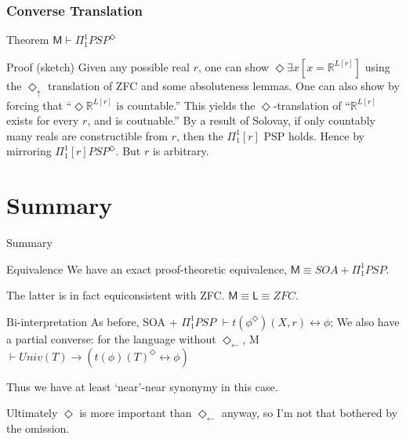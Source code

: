 \documentclass{beamer}
\newcommand{\dl}{\Diamond_\leftarrow}
\begin{document}
\begin{frame}
    \frametitle{Converse Translation}
\begin{block}{Theorem}
$\mathsf{M} \vdash \Pi_1^1 PSP^\Diamond$
\end{block}
\begin{block}{Proof (sketch)}
     Given any possible real $r$, one can show $\Diamond \exists x[ x = \mathbb{R}^{L[r]}]$
    using the $\Diamond_\uparrow$ translation of ZFC and some absoluteness lemmas. 
     One can also show by forcing that ``$\Diamond \mathbb{R}^{L[r]} \text{ is countable}$.''
     This yields the $\Diamond$-translation of ``$\mathbb{R}^{L[r]}$ exists for every $r$, and is coutnable.''
     By a result of Solovay, if only countably many reals are constructible 
    from $r$, then the $\Pi_1^1[r]$ PSP holds.
     Hence by mirroring $\Pi_1^1[r] PSP^\Diamond$.
     But $r$ is arbitrary.
    
\end{block}
\end{frame}
\section{Summary}
\begin{frame}{Summary}
    \begin{block}{Equivalence}
        We have an exact proof-theoretic equivalence, $\mathsf{M} \equiv SOA + \Pi_1^1 PSP$.

         The latter is in fact equiconsistent with ZFC. $\mathsf{M} \equiv \mathsf{L} \equiv ZFC$.
    \end{block}
    \begin{block}{Bi-interpretation}
        As before, SOA + $\Pi_1^1 PSP$ $\vdash t(\phi^\Diamond)(X, r) \leftrightarrow \phi$; 
         We also have a partial converse: for the language without $\dl$,
        M $\vdash Univ(T) \rightarrow (t(\phi)(T)^\Diamond \leftrightarrow \phi)$
    \end{block}
 Thus we have at least `near'-near synonymy in this case. 

 Ultimately $\Diamond$ is more important than $\dl$ anyway, 
so I'm not that bothered by the omission.
\end{frame}
\end{document}
